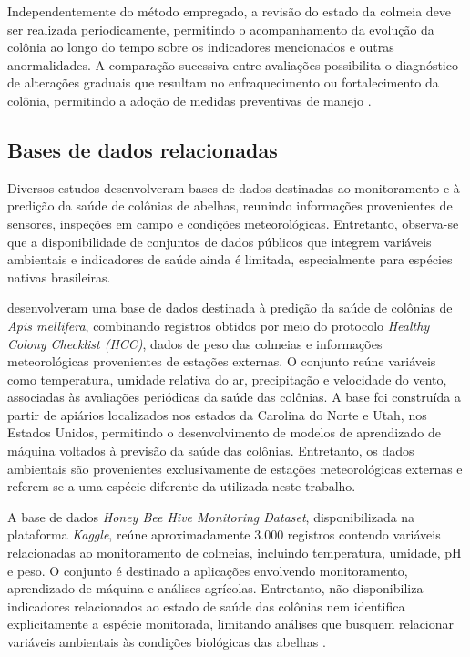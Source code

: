 \documentclass[12pt]{unisenaiclass}
\begin{document}
Independentemente do método empregado, a revisão do estado da colmeia deve ser realizada periodicamente, permitindo o acompanhamento da evolução da colônia ao longo do tempo sobre os indicadores mencionados e outras anormalidades. A comparação sucessiva entre avaliações possibilita o diagnóstico de alterações graduais que resultam no enfraquecimento ou fortalecimento da colônia, permitindo a adoção de medidas preventivas de manejo \cite{witterconservacao2014,senarmeliponicultura2024}.

\subsection{Bases de dados relacionadas}

Diversos estudos desenvolveram bases de dados destinadas ao monitoramento e à predição da saúde de colônias de abelhas, reunindo informações provenientes de sensores, inspeções em campo e condições meteorológicas. Entretanto, observa-se que a disponibilidade de conjuntos de dados públicos que integrem variáveis ambientais e indicadores de saúde ainda é limitada, especialmente para espécies nativas brasileiras.

\cite{lowerpredicting2022} desenvolveram uma base de dados destinada à predição da saúde de colônias de \textit{Apis mellifera}, combinando registros obtidos por meio do protocolo \textit{Healthy Colony Checklist (HCC)}, dados de peso das colmeias e informações meteorológicas provenientes de estações externas. O conjunto reúne variáveis como temperatura, umidade relativa do ar, precipitação e velocidade do vento, associadas às avaliações periódicas da saúde das colônias. A base foi construída a partir de apiários localizados nos estados da Carolina do Norte e Utah, nos Estados Unidos, permitindo o desenvolvimento de modelos de aprendizado de máquina voltados à previsão da saúde das colônias. Entretanto, os dados ambientais são provenientes exclusivamente de estações meteorológicas externas e referem-se a uma espécie diferente da utilizada neste trabalho.

A base de dados \textit{Honey Bee Hive Monitoring Dataset}, disponibilizada na plataforma \textit{Kaggle}, reúne aproximadamente 3.000 registros contendo variáveis relacionadas ao monitoramento de colmeias, incluindo temperatura, umidade, pH e peso. O conjunto é destinado a aplicações envolvendo monitoramento, aprendizado de máquina e análises agrícolas. Entretanto, não disponibiliza indicadores relacionados ao estado de saúde das colônias nem identifica explicitamente a espécie monitorada, limitando análises que busquem relacionar variáveis ambientais às condições biológicas das abelhas \cite{honeybeehivemonitoringdataset}.
\end{document}
